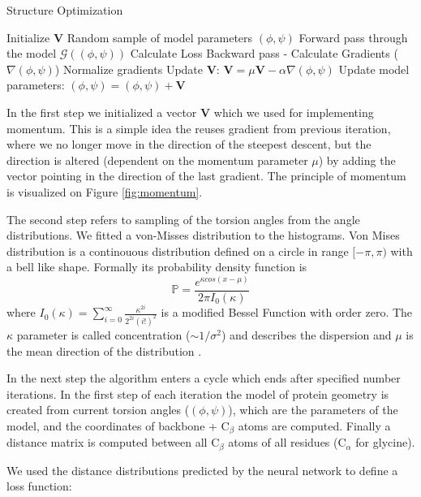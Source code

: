 \begin{algorithm}[ht]
\caption{Structure Optimization}
\label{alg:strucreal_gd}
\begin{algorithmic}[1]
\State Initialize $\bm{V}$
\State Random sample of model parameters $(\phi, \psi)$
    \Repeat
        \State Forward pass through the model $\mathcal{G}((\phi, \psi))$
        \State Calculate Loss
        \State Backward pass - Calculate Gradients ($\nabla (\phi, \psi)$)
        \State Normalize gradients
        \State Update $\bm{V}$: $\bm{V} = \mu \bm{V} - \alpha \nabla (\phi, \psi)$
        \State Update model parameters: $(\phi, \psi) = (\phi, \psi) + \bm{V}$
\end{algorithmic}
\end{algorithm}

In the first step we initialized a vector $\bm{V}$ which we used for implementing momentum. This is a simple idea the reuses gradient from previous iteration, where we no longer move in the direction of the steepest descent, but the direction is altered (dependent on the momentum parameter $\mu$) by adding the vector pointing in the direction of the last gradient. The principle of momentum is visualized on Figure \ref{fig:momentum}.

The second step refers to sampling of the torsion angles from the angle distributions. We fitted a von-Misses distribution to the histograms. Von Mises distribution is a continouous distribution defined on a circle in range $[-\pi, \pi)$ with a bell like shape. Formally its probability density function is 
$$\mathds{P} = \frac{e^{\kappa cos(x - \mu)}}{2\pi I_0(\kappa)}$$ 
where $I_0(\kappa) = \sum_{i=0}^\infty \frac{\kappa^{2i}}{2^{2i}(i!)^2}$ is a modified Bessel Function with order zero. 
The $\kappa$ parameter is called concentration ($\sim 1/\sigma^2$) and describes the dispersion and $\mu$ is the mean direction of the distribution \cite{vonmises}. 

In the next step the algorithm enters a cycle which ends after specified number iterations. In the first step of each iteration the model of protein geometry is created from current torsion angles ($(\phi, \psi)$), which are the parameters of the model, and the coordinates of backbone + C$_\beta$ atoms are computed. Finally a distance matrix is computed between all C$_\beta$ atoms of all residues (C$_\alpha$ for glycine).

We used the distance distributions predicted by the neural network to define a loss function:


